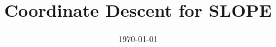 \documentclass[english,a4paper]{article}
\title{Coordinate Descent for SLOPE}
\date{\today}
\theoremstyle{plain}
\theoremstyle{definition}
\theoremstyle{remark}
\begin{document}
\maketitle

\begin{abstract}
  
\end{abstract}







\printbibliography

\appendix


\end{document}
